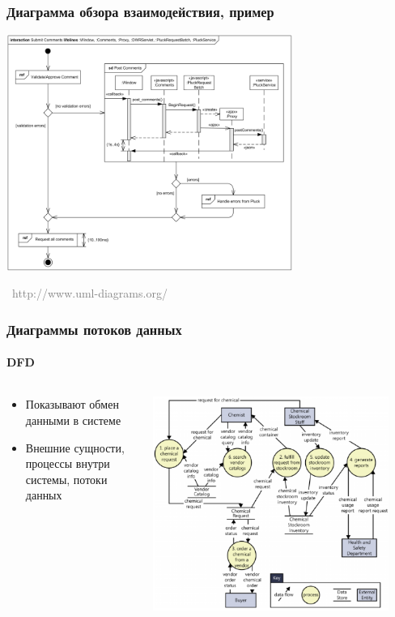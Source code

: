 \documentclass[xetex,mathserif,serif]{beamer}
\newcommand{\attribution}[1] {
	\vspace{-5mm}\begin{flushright}\begin{scriptsize}\textcolor{gray}{\textcopyright\, #1}\end{scriptsize}\end{flushright}
}
\begin{document}
	\begin{frame}
		\frametitle{Диаграмма обзора взаимодействия, пример}
		\begin{center}
			\includegraphics[width=0.7\textwidth]{interactionOverviewExample.png}
			\attribution{http://www.uml-diagrams.org/}
		\end{center}
	\end{frame}

	\begin{frame}
		\frametitle{Диаграммы потоков данных}
		\framesubtitle{DFD}
		\begin{columns}
			\begin{column}{0.4\textwidth}
				\begin{itemize}
					\item Показывают обмен данными в системе
					\item Внешние сущности, процессы внутри системы, потоки данных
				\end{itemize}
			\end{column}
			\begin{column}{0.6\textwidth}
				\begin{center}
					\includegraphics[width=0.9\textwidth]{dfd.png}
				\end{center}
			\end{column}
		\end{columns}
	\end{frame}
\end{document}
